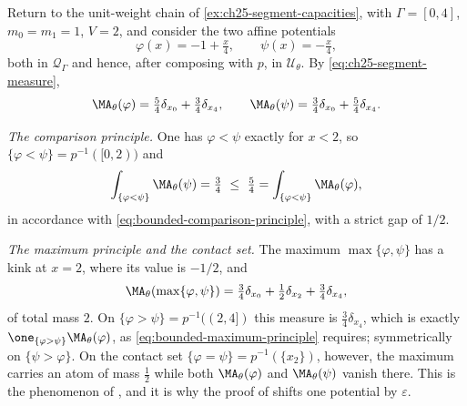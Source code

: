 \begin{example}
\label{ex:ch25-comparison-numbers}
Return to the unit-weight chain of
\cref{ex:ch25-segment-capacities}, with \(\Gamma=[0,4]\),
\(m_0=m_1=1\), \(V=2\), and consider the two affine potentials
\[
 \varphi(x)=-1+\tfrac x4,\qquad \psi(x)=-\tfrac x4,
\]
both in \(\mathcal Q_\Gamma\) and hence, after composing with \(p\), in
\(\mathcal U_\theta\).  By \eqref{eq:ch25-segment-measure},
\[
 \MA_\theta(\varphi)=\tfrac54\delta_{x_0}+\tfrac34\delta_{x_4},
 \qquad
 \MA_\theta(\psi)=\tfrac34\delta_{x_0}+\tfrac54\delta_{x_4}.
\]

\emph{The comparison principle.}  One has \(\varphi<\psi\) exactly for
\(x<2\), so \(\{\varphi<\psi\}=p^{-1}([0,2))\) and
\[
 \int_{\{\varphi<\psi\}}\MA_\theta(\psi)=\tfrac34
 \ \leq\ \tfrac54=\int_{\{\varphi<\psi\}}\MA_\theta(\varphi),
\]
in accordance with \eqref{eq:bounded-comparison-principle}, with a strict
gap of \(1/2\).

\emph{The maximum principle and the contact set.}  The maximum
\(\max\{\varphi,\psi\}\) has a kink at \(x=2\), where its value is
\(-1/2\), and
\[
 \MA_\theta(\max\{\varphi,\psi\})
 =\tfrac34\delta_{x_0}+\tfrac12\delta_{x_2}+\tfrac34\delta_{x_4},
\]
of total mass \(2\).  On \(\{\varphi>\psi\}=p^{-1}((2,4])\) this measure is
\(\tfrac34\delta_{x_4}\), which is exactly
\(\one_{\{\varphi>\psi\}}\MA_\theta(\varphi)\), as
\eqref{eq:bounded-maximum-principle} requires; symmetrically on
\(\{\psi>\varphi\}\).  On the contact set
\(\{\varphi=\psi\}=p^{-1}(\{x_2\})\), however, the maximum carries an atom of
mass \(\tfrac12\) while both \(\MA_\theta(\varphi)\) and
\(\MA_\theta(\psi)\) vanish there.  This is the phenomenon of
, and it is why the proof of
 shifts one potential by
\(\varepsilon\).


\end{example}
